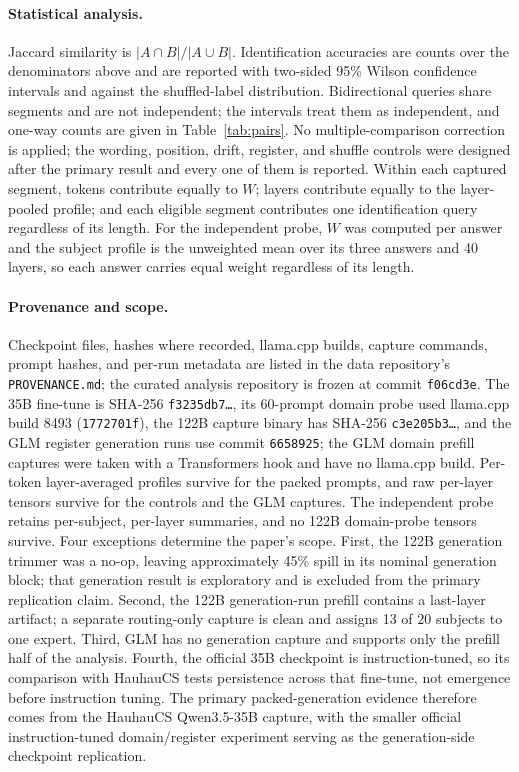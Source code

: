 \documentclass[10pt,twocolumn]{article}
\begin{document}
\paragraph{Statistical analysis.} Jaccard similarity is $|A\cap B|/|A\cup B|$. Identification accuracies are counts over the denominators above and are reported with two-sided 95\% Wilson confidence intervals and against the shuffled-label distribution. Bidirectional queries share segments and are not independent; the intervals treat them as independent, and one-way counts are given in Table~\ref{tab:pairs}. No multiple-comparison correction is applied; the wording, position, drift, register, and shuffle controls were designed after the primary result and every one of them is reported. Within each captured segment, tokens contribute equally to $W$; layers contribute equally to the layer-pooled profile; and each eligible segment contributes one identification query regardless of its length. For the independent probe, $W$ was computed per answer and the subject profile is the unweighted mean over its three answers and 40 layers, so each answer carries equal weight regardless of its length.

\paragraph{Provenance and scope.} Checkpoint files, hashes where recorded, llama.cpp builds, capture commands, prompt hashes, and per-run metadata are listed in the data repository's \texttt{PROVENANCE.md}; the curated analysis repository is frozen at commit \texttt{f06cd3e}. The 35B fine-tune is SHA-256 \texttt{f3235db7\ldots}, its 60-prompt domain probe used llama.cpp build 8493 (\texttt{1772701f}), the 122B capture binary has SHA-256 \texttt{c3e205b3\ldots}, and the GLM register generation runs use commit \texttt{6658925}; the GLM domain prefill captures were taken with a Transformers hook and have no llama.cpp build. Per-token layer-averaged profiles survive for the packed prompts, and raw per-layer tensors survive for the controls and the GLM captures. The independent probe retains per-subject, per-layer summaries, and no 122B domain-probe tensors survive. Four exceptions determine the paper's scope. First, the 122B generation trimmer was a no-op, leaving approximately 45\% spill in its nominal generation block; that generation result is exploratory and is excluded from the primary replication claim. Second, the 122B generation-run prefill contains a last-layer artifact; a separate routing-only capture is clean and assigns 13 of 20 subjects to one expert. Third, GLM has no generation capture and supports only the prefill half of the analysis. Fourth, the official 35B checkpoint is instruction-tuned, so its comparison with HauhauCS tests persistence across that fine-tune, not emergence before instruction tuning. The primary packed-generation evidence therefore comes from the HauhauCS Qwen3.5-35B capture, with the smaller official instruction-tuned domain/register experiment serving as the generation-side checkpoint replication.
\end{document}
